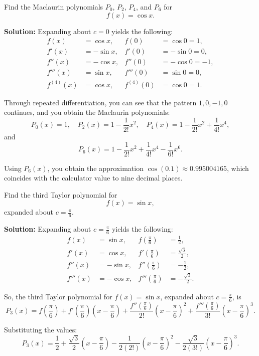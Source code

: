 \documentclass[12pt]{article}
\theoremstyle{beautifulthm}
\begin{document}
\begin{tcolorbox}[colback=examplebg, colframe=red!75!black, title=\textbf{EXAMPLE 4: Finding Maclaurin Polynomials for $\cos x$}, fonttitle=\bfseries, sharp corners]
Find the Maclaurin polynomials $P_0$, $P_2$, $P_4$, and $P_6$ for 
\[
f(x) = \cos x.
\]


\tcblower
\textbf{Solution:} 
Expanding about $c = 0$ yields the following:
\[
\begin{aligned}
f(x) &= \cos x, & f(0) &= \cos 0 = 1, \\
f'(x) &= -\sin x, & f'(0) &= -\sin 0 = 0, \\
f''(x) &= -\cos x, & f''(0) &= -\cos 0 = -1, \\
f'''(x) &= \sin x, & f'''(0) &= \sin 0 = 0, \\
f^{(4)}(x) &= \cos x, & f^{(4)}(0) &= \cos 0 = 1.
\end{aligned}
\]

Through repeated differentiation, you can see that the pattern $1, 0, -1, 0$ continues, and you obtain the Maclaurin polynomials:
\[
P_0(x) = 1, \quad P_2(x) = 1 - \frac{1}{2!}x^2, \quad P_4(x) = 1 - \frac{1}{2!}x^2 + \frac{1}{4!}x^4,
\]
and
\[
P_6(x) = 1 - \frac{1}{2!}x^2 + \frac{1}{4!}x^4 - \frac{1}{6!}x^6.
\]

Using $P_6(x)$, you obtain the approximation $\cos(0.1) \approx 0.995004165$, which coincides with the calculator value to nine decimal places.
\end{tcolorbox}





\begin{tcolorbox}[colback=examplebg, colframe=red!75!black, title=\textbf{EXAMPLE 5: Find the Integral of the Function}, fonttitle=\bfseries, sharp corners]

Find the third Taylor polynomial for 
\[
f(x) = \sin x,
\]
expanded about $c = \frac{\pi}{6}$.

\tcblower
\textbf{Solution:} 
Expanding about $c = \frac{\pi}{6}$ yields the following:
\[
\begin{aligned}
f(x) &= \sin x, & f\left(\frac{\pi}{6}\right) &= \frac{1}{2}, \\
f'(x) &= \cos x, & f'\left(\frac{\pi}{6}\right) &= \frac{\sqrt{3}}{2}, \\
f''(x) &= -\sin x, & f''\left(\frac{\pi}{6}\right) &= -\frac{1}{2}, \\
f'''(x) &= -\cos x, & f'''\left(\frac{\pi}{6}\right) &= -\frac{\sqrt{3}}{2}.
\end{aligned}
\]

So, the third Taylor polynomial for $f(x) = \sin x$, expanded about $c = \frac{\pi}{6}$, is
\[
P_3(x) = f\left(\frac{\pi}{6}\right) + f'\left(\frac{\pi}{6}\right)(x-\frac{\pi}{6}) + \frac{f''\left(\frac{\pi}{6}\right)}{2!}(x-\frac{\pi}{6})^2 + \frac{f'''\left(\frac{\pi}{6}\right)}{3!}(x-\frac{\pi}{6})^3.
\]

Substituting the values:
\[
P_3(x) = \frac{1}{2} + \frac{\sqrt{3}}{2}(x-\frac{\pi}{6}) - \frac{1}{2(2!)}(x-\frac{\pi}{6})^2 - \frac{\sqrt{3}}{2(3!)}(x-\frac{\pi}{6})^3.
\]
\end{tcolorbox}
\newpage
\end{document}
